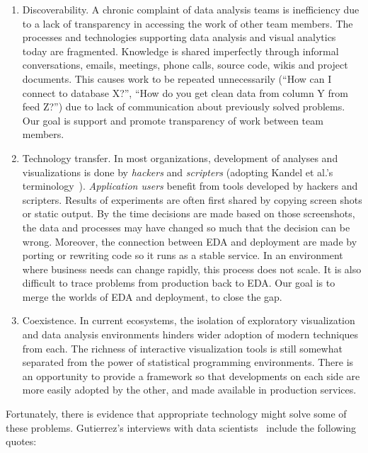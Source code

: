 \begin{enumerate}
\item Discoverability. A chronic complaint of data analysis teams is
inefficiency due to a lack of transparency in accessing the work of
other team members. The processes and technologies supporting
data analysis and visual analytics today are fragmented.
Knowledge is shared imperfectly through informal conversations, emails,
meetings, phone calls, source code, wikis and project documents.
This causes work to be repeated unnecessarily
(``How can I connect to database X?'', ``How do you get clean data
from column Y from feed Z?'') due to lack of communication about
previously solved problems. 
Our goal is support and
promote transparency of work between team members.

\item Technology transfer.
In most organizations, development of analyses and visualizations 
is done by \emph{hackers} and \emph{scripters} (adopting Kandel et al.'s
terminology~\cite{Kandel:2012:EDA}). \emph{Application users} 
benefit from tools developed by hackers and scripters.
Results of experiments are often first shared by copying screen
shots or static output. By the time decisions are made based on
those screenshots, the data and processes may have
changed so much that the decision can be wrong.
Moreover, the connection between EDA and deployment
are made by porting or rewriting code so it runs as a stable service.
In an environment where business needs can change rapidly, this
process does not scale. It is also difficult to trace problems
from production back to EDA.
Our goal is to merge the worlds of EDA and deployment, to close the gap.

\item Coexistence. In current ecosystems, the isolation of exploratory
visualization and data analysis environments hinders wider adoption of
modern techniques from each.
The richness of interactive visualization tools is still somewhat
separated from the power of statistical programming environments.
There is an opportunity to provide a framework so that developments
on each side are more easily adopted by the other, and made available
in production services.

\end{enumerate}

Fortunately, there is evidence that appropriate technology might
solve some of these problems.  Gutierrez's interviews with data
scientists~\cite{Gutierrez:2014:DSA} include the following quotes:

